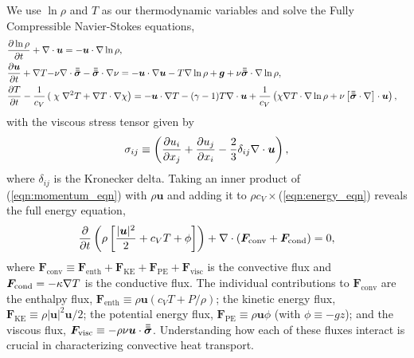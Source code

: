 We use $\ln \rho$ and $T$ as our thermodynamic variables and solve the Fully 
Compressible Navier-Stokes equations,
\begin{align}
&\begin{aligned}
&\frac{\partial \ln\rho}{\partial t} + \nabla\cdot\bm{u} 
    = -\bm{u}\cdot\nabla\ln\rho,
	\label{eqn:continuity_eqn}
\end{aligned}\\
&\begin{aligned}
\frac{\partial\bm{u}}{\partial t} + \nabla T - 
&\nu\nabla\cdot\bm{\bar{\bar{\sigma}}} - \bm{\bar{\bar{\sigma}}}\cdot\nabla\nu =
-\bm{u}\cdot\nabla\bm{u} - T\nabla\ln\rho + \bm{g} + 
\nu\bm{\bar{\bar{\sigma}}}\cdot\nabla\ln\rho,
\label{eqn:momentum_eqn}
\end{aligned}\\
&\begin{aligned}
\frac{\partial T}{\partial t} -\frac{1}{c_V}\left(\right.\chi&\left.
    \nabla^2 T + \nabla T\cdot\nabla\chi\right) =
	-\bm{u}\cdot\nabla T - (\gamma-1)T\nabla\cdot{\bm{u}}
	+ \frac{1}{c_V}\left(\chi\nabla T \cdot\nabla\ln\rho +
	\nu\left[\bm{\bar{\bar{\sigma}}}\cdot\nabla\right]\cdot\bm{u}\right), 
	\label{eqn:energy_eqn}
\end{aligned}
\end{align}
with the viscous stress tensor given by
\begin{equation}
\sigma_{ij} \equiv \left(\frac{\partial u_i}{\partial x_j} + 
\frac{\partial u_j}{\partial x_i} - \frac{2}{3}\delta_{ij}\nabla\cdot\bm{u}\right),
	\label{eqn:stress_tensor}
\end{equation}
where $\delta_{ij}$ is the Kronecker delta. Taking an inner product of
(\ref{eqn:momentum_eqn}) with $\rho\bm{u}$ and adding it to 
$\rho c_V\times$(\ref{eqn:energy_eqn}) reveals the full energy equation,
\begin{equation}
\frac{\partial}{\partial t}\left(\rho\left[\frac{|\bm{u}|^2}{2} + c_V T + \phi\right]\right) +
\nabla\cdot\left( \bm{F}_{\text{conv}} + \bm{F}_{\text{cond}}\right) = 0,
	\label{eqn:energy_eqn_full}
\end{equation}
where
$
\bm{F}_{\text{conv}} \equiv \bm{F}_{\text{enth}} + \bm{F}_{\text{KE}} + \bm{F}_{\text{PE}} + \bm{F}_{\text{visc}}
$
is the convective flux and $\bm{F}_{\text{cond}} = -\kappa \nabla T$
is the conductive flux.
The individual contributions to $\bm{F}_{\text{conv}}$ are the enthalpy flux, 
$\bm{F}_{\text{enth}} \equiv \rho\bm{u}(c_V T + P/\rho)$;
the kinetic energy flux, 
$\bm{F}_{\text{KE}} \equiv \rho|\bm{u}|^2\bm{u}/2$;
the potential energy flux,
$\bm{F}_{\text{PE}} \equiv \rho\bm{u}\phi$ (with $\phi \equiv -gz$);
and the viscous flux, 
$\bm{F}_{\text{visc}} \equiv -\rho\nu\bm{u}\cdot\bm{\bar{\bar{\sigma}}}$.
Understanding how each of these fluxes interact  
is crucial in characterizing convective heat transport.

